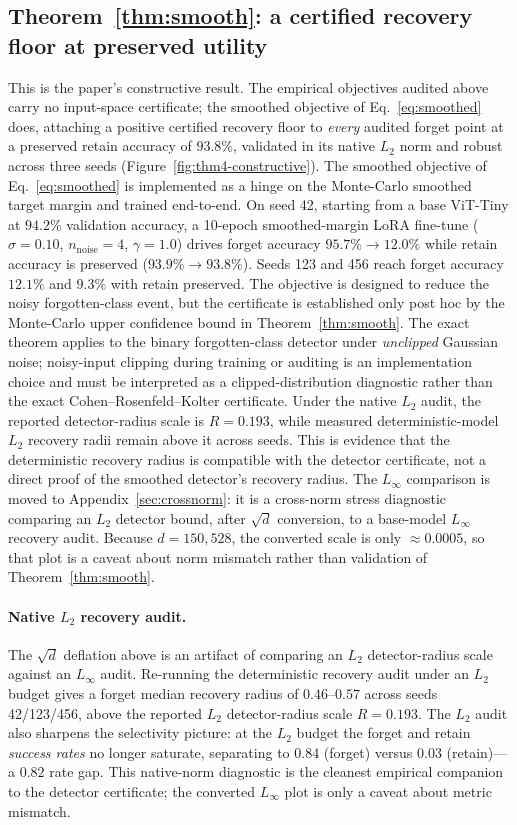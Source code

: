 \documentclass[11pt]{article}
\begin{document}
\subsection{Theorem~\ref{thm:smooth}: a certified recovery floor at preserved utility}
This is the paper's constructive result. The empirical objectives audited above carry no input-space certificate; the smoothed objective of Eq.~\eqref{eq:smoothed} does, attaching a positive certified recovery floor to \emph{every} audited forget point at a preserved retain accuracy of $93.8\%$, validated in its native $L_2$ norm and robust across three seeds (Figure~\ref{fig:thm4-constructive}). The smoothed objective of Eq.~\eqref{eq:smoothed} is implemented as a hinge on the Monte-Carlo smoothed target margin and trained end-to-end. On seed 42, starting from a base ViT-Tiny at $94.2\%$ validation accuracy, a 10-epoch smoothed-margin LoRA fine-tune ($\sigma = 0.10$, $n_{\text{noise}} = 4$, $\gamma = 1.0$) drives forget accuracy $95.7\% \to 12.0\%$ while retain accuracy is preserved ($93.9\% \to 93.8\%$). Seeds 123 and 456 reach forget accuracy $12.1\%$ and $9.3\%$ with retain preserved. The objective is designed to reduce the noisy forgotten-class event, but the certificate is established only post hoc by the Monte-Carlo upper confidence bound in Theorem~\ref{thm:smooth}. The exact theorem applies to the binary forgotten-class detector under \emph{unclipped} Gaussian noise; noisy-input clipping during training or auditing is an implementation choice and must be interpreted as a clipped-distribution diagnostic rather than the exact Cohen--Rosenfeld--Kolter certificate. Under the native $L_2$ audit, the reported detector-radius scale is $R=0.193$, while measured deterministic-model $L_2$ recovery radii remain above it across seeds. This is evidence that the deterministic recovery radius is compatible with the detector certificate, not a direct proof of the smoothed detector's recovery radius. The $L_\infty$ comparison is moved to Appendix~\ref{sec:crossnorm}: it is a cross-norm stress diagnostic comparing an $L_2$ detector bound, after $\sqrt{d}$ conversion, to a base-model $L_\infty$ recovery audit. Because $d=150{,}528$, the converted scale is only $\approx0.0005$, so that plot is a caveat about norm mismatch rather than validation of Theorem~\ref{thm:smooth}.

\paragraph{Native $L_2$ recovery audit.} The $\sqrt{d}$ deflation above is an artifact of comparing an $L_2$ detector-radius scale against an $L_\infty$ audit. Re-running the deterministic recovery audit under an $L_2$ budget gives a forget median recovery radius of $0.46$--$0.57$ across seeds 42/123/456, above the reported $L_2$ detector-radius scale $R = 0.193$. The $L_2$ audit also sharpens the selectivity picture: at the $L_2$ budget the forget and retain \emph{success rates} no longer saturate, separating to $0.84$ (forget) versus $0.03$ (retain)---a $0.82$ rate gap. This native-norm diagnostic is the cleanest empirical companion to the detector certificate; the converted $L_\infty$ plot is only a caveat about metric mismatch.
\end{document}

